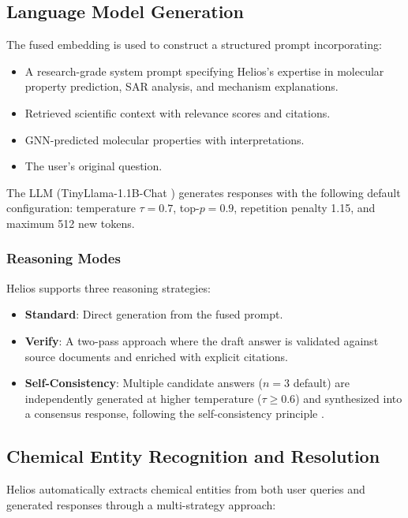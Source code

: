 \documentclass[conference]{IEEEtran}
\begin{document}
\subsection{Language Model Generation}

The fused embedding is used to construct a structured prompt incorporating:
\begin{itemize}
    \item A research-grade system prompt specifying Helios's expertise in molecular property prediction, SAR analysis, and mechanism explanations.
    \item Retrieved scientific context with relevance scores and citations.
    \item GNN-predicted molecular properties with interpretations.
    \item The user's original question.
\end{itemize}

The LLM (TinyLlama-1.1B-Chat \cite{zhang2024tinyllama}) generates responses with the following default configuration: temperature $\tau = 0.7$, top-$p = 0.9$, repetition penalty 1.15, and maximum 512 new tokens.

\subsubsection{Reasoning Modes}
Helios supports three reasoning strategies:
\begin{itemize}
    \item \textbf{Standard}: Direct generation from the fused prompt.
    \item \textbf{Verify}: A two-pass approach where the draft answer is validated against source documents and enriched with explicit citations.
    \item \textbf{Self-Consistency}: Multiple candidate answers ($n=3$ default) are independently generated at higher temperature ($\tau \geq 0.6$) and synthesized into a consensus response, following the self-consistency principle \cite{wang2023selfconsistency}.
\end{itemize}

\subsection{Chemical Entity Recognition and Resolution}

Helios automatically extracts chemical entities from both user queries and generated responses through a multi-strategy approach:
\end{document}
